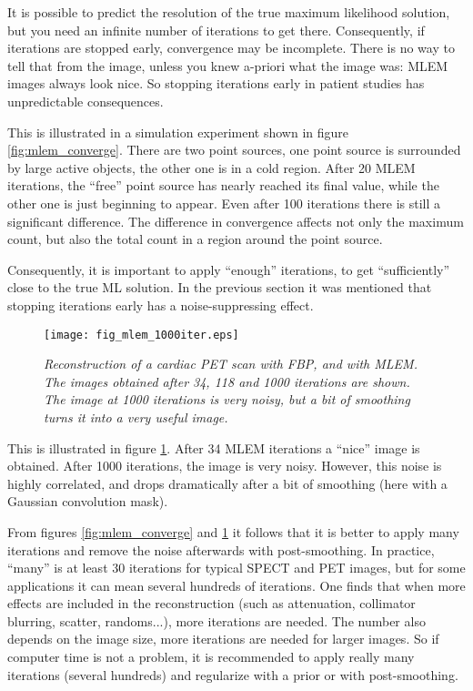 It is possible to predict the resolution of the true maximum likelihood
solution, but you need an infinite number of iterations to get
there. Consequently, if iterations are stopped early, convergence may be
incomplete. There is no way to tell that from the image, unless you knew
a-priori what the image was: MLEM images always look nice. So stopping
iterations early in patient studies has unpredictable consequences.

This is illustrated in a simulation experiment shown in figure
\ref{fig:mlem_converge}. There are two point sources, one point source is
surrounded by large active objects, the other one is in a cold region. After
20 MLEM iterations, the ``free'' point source has nearly reached its final
value, while the other one is just beginning to appear. Even after 100
iterations there is still a significant difference. The difference in
convergence affects not only the maximum count, but also the total count in a
region around the point source.

Consequently, it is important to apply ``enough'' iterations, to get
``sufficiently'' close to the true ML solution. In the previous section it was
mentioned that stopping iterations early has a noise-suppressing effect. 
%
\begin{figure}[tb]
\centering
\texttt{[image: fig\_mlem\_1000iter.eps]}
\caption{\label{fig:mlem_1000iter} \emph{Reconstruction of a cardiac PET scan
with FBP, and with MLEM. The images obtained after 34, 118 and 1000 iterations
are shown. The image at 1000 iterations is very noisy, but a bit of smoothing
turns it into a very useful image.}}
\end{figure}
%
This is illustrated in figure \ref{fig:mlem_1000iter}. After 34 MLEM
iterations a ``nice'' image is obtained. After 1000 iterations, the image is
very noisy. However, this noise is highly correlated, and drops dramatically
after a bit of smoothing (here with a Gaussian convolution mask). 

From figures \ref{fig:mlem_converge} and \ref{fig:mlem_1000iter} it follows
that it is better to apply many iterations and remove the noise afterwards
with post-smoothing. In practice, ``many'' is at least 30 iterations for
typical SPECT and PET images, but for some applications it can mean several
hundreds of iterations. One finds that when more effects are included in
the reconstruction (such as attenuation, collimator blurring, scatter,
randoms...), more iterations are needed.  The number also depends on the image
size, more iterations are needed for larger images. So if computer time is not
a problem, it is recommended to apply really many iterations (several
hundreds) and regularize with a prior or with post-smoothing.

